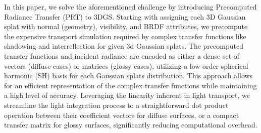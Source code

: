 
In this paper, we solve the aforementioned challenge by introducing Precomputed Radiance Transfer (PRT) \cite{sloan2002precomputed} to 3DGS. Starting with assigning each 3D Gaussian splat with normal (geometry), visibility, and BRDF attributes, we precompute the expensive transport simulation required by complex transfer functions like shadowing and interreflection for given 3d Gaussian splats. The precomputed transfer functions and incident radiance are encoded as either a dense set of vectors (diffuse cases) or matrices (glossy cases), utilizing a low-order spherical harmonic (SH) basis for each Gaussian splats distribution. This approach allows for an efficient representation of the complex transfer functions while maintaining a high level of accuracy. Leveraging the linearity inherent in light transport, we streamline the light integration process to a straightforward dot product operation between their coefficient vectors for diffuse surfaces, or a compact transfer matrix for glossy surfaces, significantly reducing computational overhead. 


